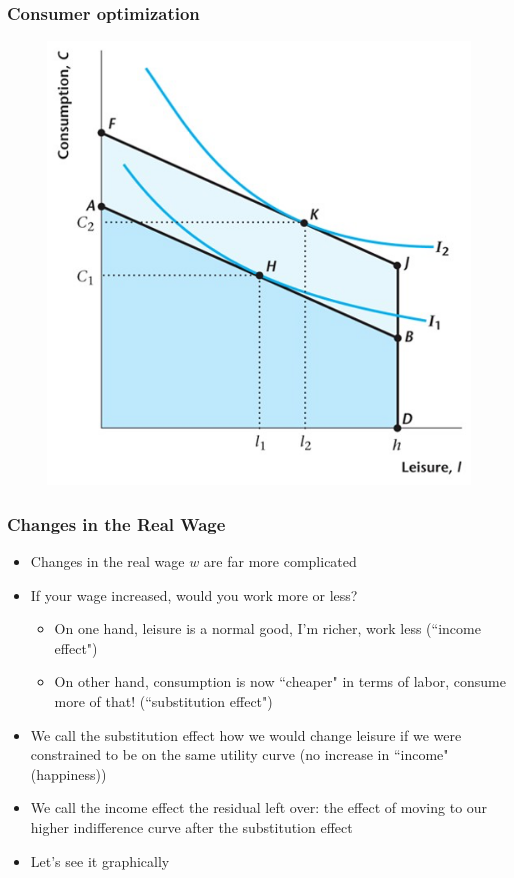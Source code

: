 \documentclass{beamer}
\begin{document}
\begin{frame}
\frametitle[alignment=center]{Consumer optimization}
\begin{figure}
\centering
\includegraphics[scale=0.5]{Figures/W_Fig_4pt7.png}
\end{figure}
\end{frame}


\begin{frame}
\frametitle[alignment=center]{Changes in the Real Wage}
\begin{itemize}
\item Changes in the real wage $w$ are far more complicated
\bigskip
\item If your wage increased, would you work more or less?
\begin{itemize}
\item On one hand, leisure is a normal good, I'm richer, work less  (``income effect")
\item On other hand, consumption is now ``cheaper" in terms of labor, consume more of that! (``substitution effect")
\end{itemize}
\item We call the substitution effect how we would change leisure if we were constrained to be on the same utility curve (no increase in ``income" (happiness))
\item We call the income effect the residual left over: the effect of moving to our higher indifference curve after the substitution effect
\item Let's see it graphically
\end{itemize}
\end{frame}
\end{document}

